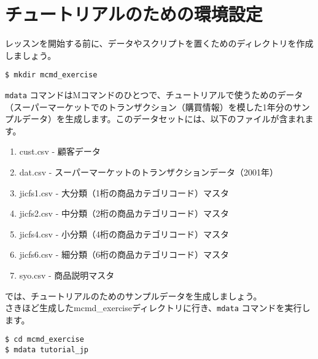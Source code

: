 

%


\section{チュートリアルのための環境設定}

レッスンを開始する前に、データやスクリプトを置くためのディレクトリを作成しましょう。\\

\begin{verbatim}
$ mkdir mcmd_exercise
\end{verbatim}

\verb|mdata| コマンドはMコマンドのひとつで、チュートリアルで使うためのデータ（スーパーマーケットでのトランザクション（購買情報）を模した1年分のサンプルデータ）を生成します。このデータセットには、以下のファイルが含まれます。\\

\begin{enumerate}
 	\item cust.csv - 顧客データ
 	\item dat.csv - スーパーマーケットのトランザクションデータ（2001年）
	\item jicfs1.csv - 大分類（1桁の商品カテゴリコード）マスタ
	\item jicfs2.csv - 中分類（2桁の商品カテゴリコード）マスタ
	\item jicfs4.csv - 小分類（4桁の商品カテゴリコード）マスタ
	\item jicfs6.csv - 細分類（6桁の商品カテゴリコード）マスタ
	\item syo.csv - 商品説明マスタ
\end{enumerate}

では、チュートリアルのためのサンプルデータを生成しましょう。\\

さきほど生成したmcmd\_exerciseディレクトリに行き、\verb|mdata| コマンドを実行します。\\

\begin{verbatim}
$ cd mcmd_exercise
$ mdata tutorial_jp
\end{verbatim}

